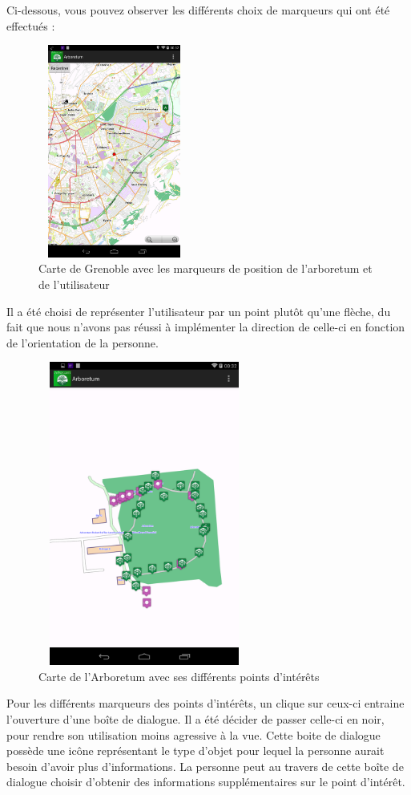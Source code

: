 \documentclass[a4paper,11pt]{article}
\begin{document}
			Ci-dessous, vous pouvez observer les différents choix de marqueurs qui ont été effectués : %
    \begin{figure}[H]
     \begin{center}
      \includegraphics[width=5cm,height=7cm]{grenoble.png}
      \caption{Carte de Grenoble avec les marqueurs de position de l'arboretum et de l'utilisateur}
     \end{center}
    \end{figure}
			Il a été choisi de représenter l'utilisateur par un point plutôt qu'une flèche, du fait que nous n'avons pas réussi à implémenter la direction de celle-ci en fonction de l'orientation de la personne.
     \begin{figure}[H]
     \begin{center}
      \includegraphics[width=7cm,height=10cm]{arbo.png}
      \caption{Carte de l'Arboretum avec ses différents points d'intérêts}
     \end{center}
    \end{figure}
			Pour les différents marqueurs des points d'intérêts, un clique sur ceux-ci entraine l'ouverture d'une boîte de dialogue. 
			Il a été décider de passer celle-ci en noir, pour rendre son utilisation moins agressive à la vue. 
			Cette boite de dialogue possède une icône représentant le type d'objet pour lequel la personne aurait besoin d'avoir plus d'informations. La personne peut au travers de cette boîte de dialogue choisir d'obtenir des informations supplémentaires sur le point d'intérêt.
		
\end{document}
